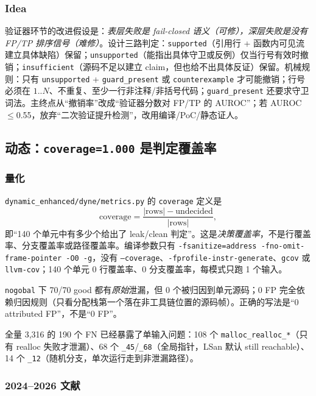 \documentclass[conference]{IEEEtran}
\begin{document}
\subsubsection{Idea}

验证器环节的改进假设是：\emph{表层失败是 fail-closed 语义（可修），深层失败是没有 FP/TP 排序信号（难修）}。设计三路判定：\texttt{supported}（引用行 + 函数内可见流建立具体缺陷）保留；\texttt{unsupported}（能指出具体守卫或反例）仅当行号有效时撤销；\texttt{insufficient}（源码不足以建立 claim，但也给不出具体反证）保留。机械规则：只有 \texttt{unsupported} + \texttt{guard\_present} 或 \texttt{counterexample} 才可能撤销；行号必须在 $1..N$、不重复、至少一行非注释/非括号代码；\texttt{guard\_present} 还要求守卫词法。主终点从“撤销率”改成“验证器分数对 FP/TP 的 AUROC”；若 AUROC $\le$0.55，放弃“二次验证提升检测”，改用编译/PoC/静态证人。

\subsection{动态：\texttt{coverage=1.000} 是判定覆盖率}
\label{sec:gap-dynamic}

\subsubsection{量化}

\texttt{dynamic\_enhanced/dyne/metrics.py} 的 \texttt{coverage} 定义是
\begin{equation}
\text{coverage} = \frac{|\text{rows}| - \text{undecided}}{|\text{rows}|},
\end{equation}
即“140 个单元中有多少个给出了 leak/clean 判定”。这是\emph{决策覆盖率}，不是行覆盖率、分支覆盖率或路径覆盖率。编译参数只有 \texttt{-fsanitize=address -fno-omit-frame-pointer -O0 -g}，没有 \texttt{--coverage}、\texttt{-fprofile-instr-generate}、\texttt{gcov} 或 \texttt{llvm-cov}；140 个单元 0 行覆盖率、0 分支覆盖率，每模式只跑 1 个输入。

\texttt{nogobal} 下 70/70 good 都有\emph{原始}泄漏，但 0 个被归因到单元源码；0 FP 完全依赖归因规则（只看分配栈第一个落在非工具链位置的源码帧）。正确的写法是“0 attributed FP”，不是“0 FP”。

全量 3{,}316 的 190 个 FN 已经暴露了单输入问题：108 个 \texttt{malloc\_realloc\_*}（只有 realloc 失败才泄漏）、68 个 \texttt{\_45}/\texttt{\_68}（全局指针，LSan 默认 still reachable）、14 个 \texttt{\_12}（随机分支，单次运行走到非泄漏路径）。

\subsubsection{2024--2026 文献}
\end{document}
